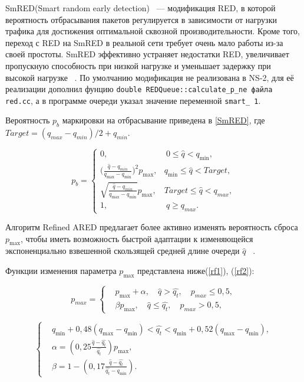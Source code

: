 SmRED(Smart random early detection) ~--- модификация RED, в которой
вероятность отбрасывания пакетов регулируется в зависимости от нагрузки трафика для достижения оптимальной сквозной производительности.
Кроме того, переход с RED на SmRED в реальной сети требует очень мало работы из-за своей простоты. SmRED эффективно устраняет недостатки
RED, увеличивает пропускную способность при низкой нагрузке и уменьшает задержку при высокой нагрузке ~\cite{SmRED}. По умолчанию модификация не реализована в NS-2, для её реализации дополнил фунцию \verb|double REDQueue::calculate_p_ne файла red.cc|, а в программе очереди указал значение переменной \verb|smart_ 1|. 

Вероятность $p_{b}$ маркировки на отбрасывание приведена в \eqref{SmRED}, где $ Target = (q_{max} - q_{min})/2 + q_{min} $.

\begin{equation}
\label{SmRED}
p_{b} = \begin{cases}
        0, &  \ 0 \leqslant \hat{q} < q_{\min},
        \\
        ({\frac{\hat{q} - q_{min}}{q_{\max} - q_{\min}})^2} {p_{\max}}, &  q_{\min} \leqslant  \hat{q} < {Target},
        \\
        \sqrt{{\frac{\hat{q} - q_{min}}{q_{\max} - q_{\min}}}} {p_{\max}}, & {Target} \leqslant  \hat{q} < q_{max},
        \\
        1, &  \ \hat{q} \geqslant q_{max}.
\end{cases}
\end{equation}
 

Алгоритм Refined ARED предлагает более активно изменять вероятность сброса $p_{\max}$,
чтобы иметь возможность быстрой адаптации к изменяющейся
экспоненциально взвешенной скользящей средней длине очереди $\hat{q}$ ~\cite{RARED}.

Функции изменения параметра $p_{\max}$ представлена ниже(\eqref{rf1}), (\eqref{rf2}):

\begin{equation}
\label{rf1}
p_{max} = \left\{
  \begin{aligned}
& p_{\max}+\alpha, \quad  \hat{q}>\hat{q_{t}}, \quad p_{max} \leqslant 0,5, \\
& \beta p_{\max}, \quad \hat{q}\leqslant\hat{q_{t}}, \quad p_{max} > 0,5,
  \end{aligned}
\right.
\end{equation}

\begin{equation}
\label{rf2}
\left\{
  \begin{aligned}
    & q_{\min}+0,48\left(q_{\max}-q_{\min}\right) < \hat{q_t} < q_{\min}+0,52\left(q_{\max}-q_{\min}\right), \\
    & \alpha=\left(0,25\frac{\hat{q}-\hat{q_t}}{\hat{q_t}} \right)p_{\max}, \\ 
    & \beta=1-\left(0,17\frac{\hat{q}-\hat{q_t}}{\hat{q_t}-q_{\min}}\right).
  \end{aligned}
\right.
\end{equation}


